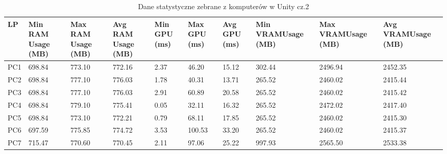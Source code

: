 \documentclass[12pt,twoside]{article}
\begin{document}
\begin{table}[h]
        \caption{Dane statystyczne zebrane z komputerów w Unity cz.2}
        \centering		
        \begin{tabular}{|p{1cm}|p{}|p{}|p{}|p{1cm}|p{1cm}|p{1cm}|p{}|p{}|p{}|}	
            \hline
            LP & Min RAM Usage (MB) & Max RAM Usage (MB) & Avg RAM Usage (MB) & Min GPU (ms) & Max GPU (ms)  & Avg GPU (ms) & Min VRAMUsage (MB) & Max VRAMUsage (MB) & Avg VRAMUsage (MB) \\
            \hline
            PC1 & 698.84 & 773.10 & 772.16 & 2.37 & 46.20 & 15.12 & 302.44 & 2496.94 & 2452.35 \\
            \hline
            PC2 & 698.84 & 777.10 & 776.03 & 1.78 & 40.31 & 13.71 & 265.52 & 2460.02 & 2415.44 \\
            \hline
            PC3 & 698.84 & 777.10 & 776.03 & 2.91 & 60.89 & 20.58 & 265.52 & 2460.02 & 2415.42 \\
            \hline
            PC4 & 698.84 & 779.10 & 775.41 & 0.05 & 32.11 & 16.32 & 265.52 & 2472.02 & 2417.40 \\
            \hline
            PC5 & 698.84 & 773.10 & 772.21 & 0.79 & 68.11 & 17.85 & 265.52 & 2460.02 & 2415.30 \\
            \hline
            PC6 & 697.59 & 775.85 & 774.72 & 3.53 & 100.53 & 33.20 & 265.52 & 2460.02 & 2415.37 \\
            \hline
            PC7 & 715.47 & 770.60 & 770.45 & 2.11 & 97.06 & 25.22 & 997.93 & 2565.50 & 2533.38 \\
            \hline

            \hline
    
        \end{tabular}	
    \label{Tabela:StatystykiUnity2}
\end{table}	
\end{document}
